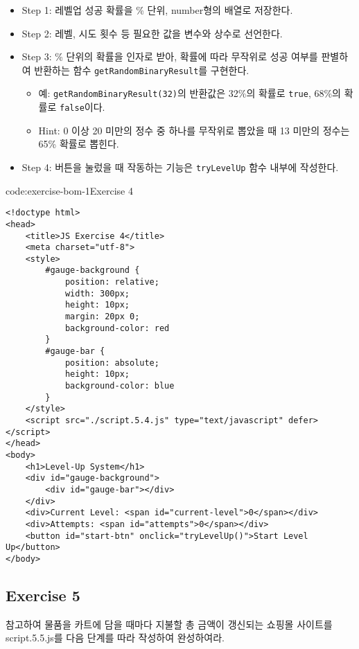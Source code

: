 \begin{itemize}
    \item Step 1: 레벨업 성공 확률을 \% 단위, number형의 배열로 저장한다. 
    \item Step 2: 레벨, 시도 횟수 등 필요한 값을 변수와 상수로 선언한다.
    \item Step 3: \% 단위의 확률을 인자로 받아, 확률에 따라 무작위로 성공 여부를 판별하여 반환하는 함수 \texttt{getRandomBinaryResult}를 구현한다.
    \begin{itemize}
        \item 예: \texttt{getRandomBinaryResult(32)}의 반환값은 32\%의 확률로 \texttt{true}, 68\%의 확률로 \texttt{false}이다.
        \item Hint: 0 이상 20 미만의 정수 중 하나를 무작위로 뽑았을 때 13 미만의 정수는 65\% 확률로 뽑힌다.
    \end{itemize}
    \item Step 4: 버튼을 눌렀을 때 작동하는 기능은 \texttt{tryLevelUp} 함수 내부에 작성한다.
\end{itemize}

\begin{codeenv}{code:exercise-bom-1}{Exercise 4}\begin{verbatim}
<!doctype html>
<head>
    <title>JS Exercise 4</title>
    <meta charset="utf-8">
    <style>
        #gauge-background {
            position: relative;
            width: 300px;
            height: 10px;
            margin: 20px 0;
            background-color: red
        }
        #gauge-bar {
            position: absolute;
            height: 10px;
            background-color: blue
        }
    </style>
    <script src="./script.5.4.js" type="text/javascript" defer></script>
</head>
<body>
    <h1>Level-Up System</h1>
    <div id="gauge-background">
        <div id="gauge-bar"></div>
    </div>
    <div>Current Level: <span id="current-level">0</span></div>
    <div>Attempts: <span id="attempts">0</span></div>
    <button id="start-btn" onclick="tryLevelUp()">Start Level Up</button>
</body>
\end{verbatim}
\end{codeenv}

\subsection*{Exercise 5}

\을 참고하여 물품을 카트에 담을 때마다 지불할 총 금액이 갱신되는 쇼핑몰 사이트를 script.5.5.js를 다음 단계를 따라 작성하여 완성하여라.

